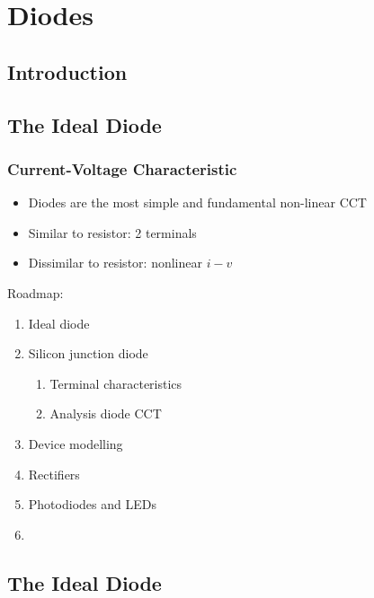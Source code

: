 \documentclass{report}
\begin{document}


\chapter{Diodes}

\section*{Introduction}

\section{The Ideal Diode}

\subsection{Current-Voltage Characteristic}

\begin{itemize}
	\item Diodes are the most simple and fundamental non-linear CCT
	\item Similar to resistor: 2 terminals
	\item Dissimilar to resistor: nonlinear $i-v$
\end{itemize}

\noindent Roadmap:
\begin{enumerate}
	\item Ideal diode
	\item Silicon junction diode
	\begin{enumerate}
		\item Terminal characteristics
		\item Analysis diode CCT
	\end{enumerate}
	\item Device modelling
	\item Rectifiers
	\item Photodiodes and LEDs
	\item {}
\end{enumerate}

\section{The Ideal Diode}
\end{document}
